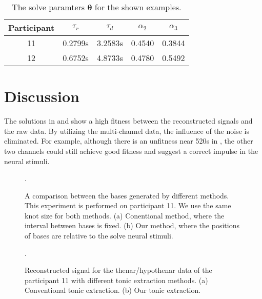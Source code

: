 \documentclass[10pt,conference]{ieeeconf}
\begin{document}
\begin{table}[h] 
  \centering
  \caption{The solve paramters $\boldsymbol{\theta}$ for the shown examples.} \label{tab:theta}
  \begin{tabular}{|c|c|c|c|c|}
    \hline
    Participant & $\tau_r$ & $\tau_d$ & $\alpha_{2}$ & $\alpha_{3}$ \\
    \hline
    11 & 0.2799s & 3.2583s & 0.4540 & 0.3844\\ \hline
    12 & 0.6752s & 4.8733s & 0.4780 & 0.5492\\
    \hline
  \end{tabular}
\end{table}

\section{Discussion}

The solutions in  and  show a high fitness between the reconstructed signals and the raw data. By utilizing the multi-channel data, the influence of the noise is eliminated. For example, although there is an unfitness near 520s in , the other two channels could still achieve good fitness and suggest a correct impulse in the neural stimuli.

\begin{figure}[!tb]
  \centering
  \DeclareGraphicsExtensions.
  \caption{A comparison between the bases generated by different methods. This experiment is performed on participant 11. We use the same knot size for both methods. (a) Conentional method, where the interval between bases is fixed. (b) Our method, where the positions of bases are relative to the solve neural stimuli.} \label{fig:bases}
\end{figure}

\begin{figure}[!tb]
  \centering
  \DeclareGraphicsExtensions.
  \caption{Reconstructed signal for the thenar/hypothenar data of the participant 11 with different tonic extraction methods. (a) Conventional tonic extraction. (b) Our tonic extraction.} \label{fig:comptonic}
\end{figure}
\end{document}
